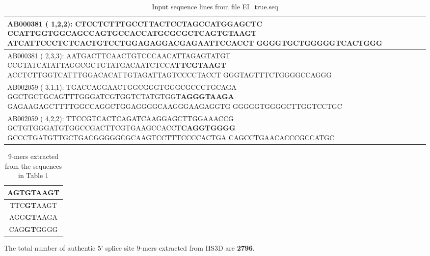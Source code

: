 \documentclass[12pt,a4paper]{article}
\begin{document}
	\begin{table}[H]
	\caption{Input sequence lines from file EI\_true.seq}
	\begin{tabular}{ | p{\linewidth} |}
		\hline
		AB000381  ( 1,2,2): CTCCTCTTTGCCTTACTCCTAGCCATGGAGCTC \newline
		CCATTGGTGGCAGCCAGTGCCACCATGCGCGCTC\textbf{AGTGTAAGT}\newline
		ATCATTCCCTCTCACTGTCCTGGAGAGGACGAGAATTCCACCT\newline
		GGGGTGCTGGGGGTCACTGGG \\
		\hline
		AB000381  ( 2,3,3): AATGACTTCAACTGTCCCAACATTAGAGTATGT \newline
		CCGTATCATATTAGGCGCTGTATGACAATCTCCA\textbf{TTCGTAAGT}\newline
		ACCTCTTGGTCATTTGGACACATTGTAGATTAGTCCCCTACCT\newline
		GGGTAGTTTCTGGGGCCAGGG \\
		\hline
        AB002059  ( 3,1,1): TGACCAGGAACTGGCGGGTGGGCGCCCTGCAGA \newline
		GGCTGCTGCAGTTTGGGATCGTGGTCTATGTGGT\textbf{AGGGTAAGA}\newline
		GAGAAGAGCTTTTGGCCAGGCTGGAGGGGCAAGGGAAGAGGTG\newline
		GGGGGTGGGGCTTGGTCCTGC \\
		\hline
		AB002059  ( 4,2,2): TTCCGTCACTCAGATCAAGGAGCTTGGAAACCG \newline
		GCTGTGGGATGTGGCCGACTTCGTGAAGCCACCT\textbf{CAGGTGGGG}\newline
		GCCCTGATGTTGCTGACGGGGGCGCAAGTCCTTTCCCCACTGA\newline
		CAGCCTGAACACCCGCCATGC \\
		\hline
	\end{tabular}
	\label{tab:ei_true}
	\end{table}
	
	
	\begin{table}[H]		
		\caption{9-mers extracted from the sequences in Table 1}
		\begin{tabular}{ | c |}
			\hline
			AGT\textbf{GT}AAGT \\
			\hline
			TTC\textbf{GT}AAGT \\
			\hline
			AGG\textbf{GT}AAGA \\
			\hline
			CAG\textbf{GT}GGGG \\
			\hline
		\end{tabular}
		\centering		
	\end{table}
	
	The total number of authentic 5’ splice site 9-mers extracted from HS3D are \textbf{2796}.
	
\end{document}
